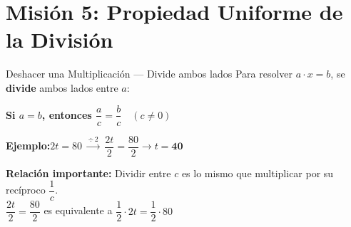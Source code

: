 \documentclass[12pt, letterpaper]{article}
\begin{document}
	\section*{Misión 5: Propiedad Uniforme de la División}
	
	\begin{concepto}{Deshacer una Multiplicación — Divide ambos lados}
		Para resolver $a \cdot x = b$, se \textbf{divide} ambos lados entre $a$:
		
		\vspace{0.3cm}
		\begin{tcolorbox}[enhanced, colback=vallightblue, colframe=valblue, arc=3pt]
			\centering\large\bfseries
			Si $a = b$, entonces $\dfrac{a}{c} = \dfrac{b}{c} \quad (c \neq 0)$
		\end{tcolorbox}
		
		\vspace{0.3cm}
		\textbf{Ejemplo:}\quad$2t = 80$\;\;
		$\xrightarrow{\div\,2}$\;\;
		$\dfrac{2t}{2} = \dfrac{80}{2}$\;\;$\rightarrow$\;\;$t = \mathbf{40}$
		
		\vspace{0.3cm}
		\textbf{Relación importante:}
		Dividir entre $c$ es lo mismo que multiplicar por su recíproco $\dfrac{1}{c}$.\\
		$\dfrac{2t}{2} = \dfrac{80}{2}$ \quad es equivalente a \quad
		$\dfrac{1}{2}\cdot 2t = \dfrac{1}{2}\cdot 80$
	\end{concepto}
	
\end{document}

